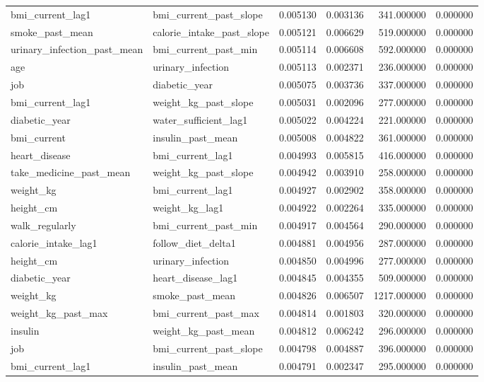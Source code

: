 \begin{longtable}{llrrrr}
bmi\_current\_lag1 & bmi\_current\_past\_slope & 0.005130 & 0.003136 & 341.000000 & 0.000000 \\
smoke\_past\_mean & calorie\_intake\_past\_slope & 0.005121 & 0.006629 & 519.000000 & 0.000000 \\
urinary\_infection\_past\_mean & bmi\_current\_past\_min & 0.005114 & 0.006608 & 592.000000 & 0.000000 \\
age & urinary\_infection & 0.005113 & 0.002371 & 236.000000 & 0.000000 \\
job & diabetic\_year & 0.005075 & 0.003736 & 337.000000 & 0.000000 \\
bmi\_current\_lag1 & weight\_kg\_past\_slope & 0.005031 & 0.002096 & 277.000000 & 0.000000 \\
diabetic\_year & water\_sufficient\_lag1 & 0.005022 & 0.004224 & 221.000000 & 0.000000 \\
bmi\_current & insulin\_past\_mean & 0.005008 & 0.004822 & 361.000000 & 0.000000 \\
heart\_disease & bmi\_current\_lag1 & 0.004993 & 0.005815 & 416.000000 & 0.000000 \\
take\_medicine\_past\_mean & weight\_kg\_past\_slope & 0.004942 & 0.003910 & 258.000000 & 0.000000 \\
weight\_kg & bmi\_current\_lag1 & 0.004927 & 0.002902 & 358.000000 & 0.000000 \\
height\_cm & weight\_kg\_lag1 & 0.004922 & 0.002264 & 335.000000 & 0.000000 \\
walk\_regularly & bmi\_current\_past\_min & 0.004917 & 0.004564 & 290.000000 & 0.000000 \\
calorie\_intake\_lag1 & follow\_diet\_delta1 & 0.004881 & 0.004956 & 287.000000 & 0.000000 \\
height\_cm & urinary\_infection & 0.004850 & 0.004996 & 277.000000 & 0.000000 \\
diabetic\_year & heart\_disease\_lag1 & 0.004845 & 0.004355 & 509.000000 & 0.000000 \\
weight\_kg & smoke\_past\_mean & 0.004826 & 0.006507 & 1217.000000 & 0.000000 \\
weight\_kg\_past\_max & bmi\_current\_past\_max & 0.004814 & 0.001803 & 320.000000 & 0.000000 \\
insulin & weight\_kg\_past\_mean & 0.004812 & 0.006242 & 296.000000 & 0.000000 \\
job & bmi\_current\_past\_slope & 0.004798 & 0.004887 & 396.000000 & 0.000000 \\
bmi\_current\_lag1 & insulin\_past\_mean & 0.004791 & 0.002347 & 295.000000 & 0.000000 \\

\end{longtable}
